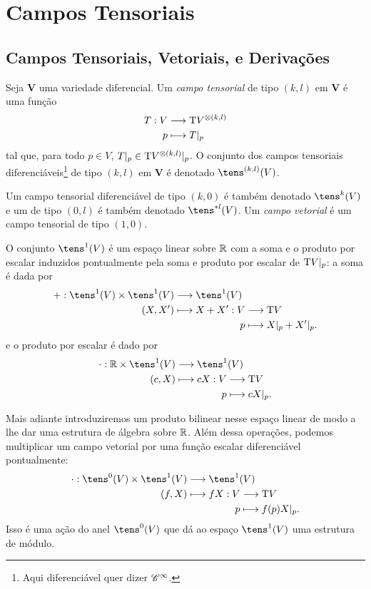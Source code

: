 \section{Campos Tensoriais}

\subsection{Campos Tensoriais, Vetoriais, e Derivações}

\begin{defi}
Seja $\bm V$ uma variedade diferencial. Um \emph{campo tensorial} de tipo $(k,l)$ em $\bm V$ é uma função
	\begin{align*}
	{T}: {V} &\longrightarrow {\mathrm{T}V^{\otimes(k,l)}} \\{p} &\longmapsto {T|_p}
	\end{align*}
tal que, para todo $p \in V$, $T|_p \in \mathrm{T} V^{\otimes(k,l)}|_p$. O conjunto dos campos tensoriais diferenciáveis\footnote{Aqui diferenciável quer dizer $\mathscr{C}^\infty$.} de tipo $(k,l)$ em $\bm V$ é denotado $\tens^{(k,l)}(V)$.

Um campo tensorial diferenciável de tipo $(k,0)$ é também denotado $\tens^k(V)$ e um de tipo $(0,l)$ é também denotado $\tens^{* l}(V)$.
Um \emph{campo vetorial} é um campo tensorial de tipo $(1,0)$.
\end{defi}

O conjunto $\tens^1(V)$ é um espaço linear sobre $\mathbb{R}$ com a soma e o produto por escalar induzidos pontualmente pela soma e produto por escalar de $\mathrm{T} V|_p$: a soma é dada por
	\begin{align*}
	\func{+}{\tens^1(V) \times \tens^1(V)}{\tens^1(V)}{(X,X')}{
	\begin{aligned}[t]
	\func{X+X'}{V}{\Tg V}{p}{X|_p + X'|_p.}
	\end{aligned}
	}
	\end{align*}
e o produto por escalar é dado por
	\begin{align*}
	\func{\cdot}{\R \times \tens^1(V)}{\tens^1(V)}{(c,X)}{
	\begin{aligned}[t]
	\func{cX}{V}{\Tg V}{p}{cX|_p.}
	\end{aligned}
	}
	\end{align*}

Mais adiante introduziremos um produto bilinear nesse espaço linear de modo a lhe dar uma estrutura de álgebra sobre $\mathbb{R}$. Além dessa operações, podemos multiplicar um campo vetorial por uma função escalar diferenciável pontualmente:
	\begin{align*}
	\func{\cdot}{\tens^0(V) \times \tens^1(V)}{\tens^1(V)}{(f,X)}{
		\begin{aligned}[t]
		\func{fX}{V}{\Tg V}{p}{f(p)X|_p.}
		\end{aligned}
	}	
	\end{align*}
Isso é uma ação do anel $\tens^0(V)$ que dá ao espaço $\tens^1(V)$ uma estrutura de módulo.

